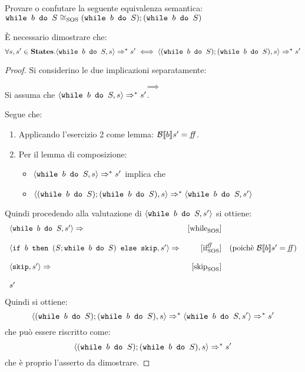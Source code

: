 {
  Provare o confutare la seguente equivalenza semantica: \vspace{.7em} \\
$\wbS{b}{S} \eqSOS (\wbS{b}{S}); (\wbS{b}{S})$
}
{




È necessario dimostrare che:
$$
\forall s,s' \in \states.
	\confSs{\wbS{b}{S}}{s} \Rar{*} s'
	\iff
	\confSs{(\wbS{b}{S}); (\wbS{b}{S})}{s} \Rar{*} s'
$$
\begin{proof} Si considerino le due implicazioni separatamente:

\vspace{10pt}
$$
\boxed{\implies}
$$
Si assuma che $\confSs{\wbS{b}{S}}{s} \Rar{*} s'$.

Segue che:
\begin{enumerate}
 \item Applicando l'esercizio 2 come lemma: $\B{b}' = \semfalse$. 
 \item Per il lemma di composizione: 
   \begin{itemize}
      \item $\confSs{\wbS{b}{S}}{s} \Rar{*} s'$ implica che
      \item $\confSs{(\wbS{b}{S}); (\wbS{b}{S})}{s} \Rar{*} \confSs{\wbS{b}{S}}{s'}$
   \end{itemize}
\end{enumerate}
Quindi procedendo alla valutazione di $\confSs{\wbS{b}{S}}{s'}$ si ottiene:
$$
\begin{array}{lrr}
\confSs{\wbS{b}{S}}{s'} \Rar{} & \whileSOS & \\
& &\\
\confSs{\ifABC{b}{(S; \wbS{b}{S})}{\skipForFriends}}{s'} \Rar{} & \ifffSOS & 
(\text{poichè }\B{b}' = \semfalse)\\
& &\\
\confSs{\skipForFriends}{s'} \Rar{} & \skipSOS\\
& &\\
s' &\\
\end{array}
$$
Quindi si ottiene:
$$
\confSs{(\wbS{b}{S}); (\wbS{b}{S})}{s} \Rar{*} \confSs{\wbS{b}{S}}{s'} \Rar{*} s'
$$
che può essere riscritto come:
$$\confSs{(\wbS{b}{S}); (\wbS{b}{S})}{s} \Rar{*} s'$$
che è proprio l'asserto da dimostrare.
\vspace{10pt}



\end{proof}}
